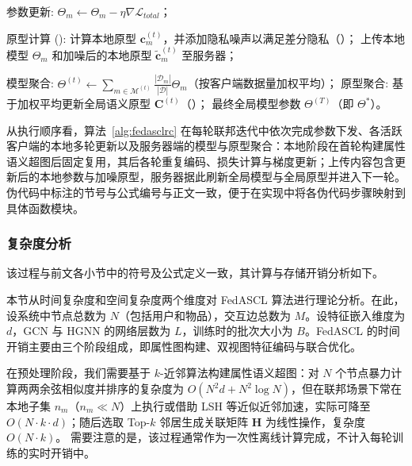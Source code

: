 \begin{algorithm}[H]
\begin{algorithmic}[1]
                    \State 参数更新: $\Theta_m \leftarrow \Theta_m - \eta \nabla \mathcal{L}_{total}$；
                \EndFor
                
                \State 原型计算 (): 计算本地原型 $\mathbf{c}_{m}^{(t)}$，并添加隐私噪声以满足差分隐私（）；
                \State 上传本地模型 $\Theta_m$ 和加噪后的本地原型 $\tilde{\mathbf{c}}_{m}^{(t)}$ 至服务器；
            \EndFor

            \State 模型聚合: $\Theta^{(t)} \leftarrow \sum_{m \in \mathcal{M}^{(t)}} \frac{|\mathcal{D}_m|}{|\mathcal{D}|} \Theta_m$（按客户端数据量加权平均）；
            \State 原型聚合: 基于加权平均更新全局语义原型 $\mathbf{C}^{(t)}$（）；
        \EndFor
        \State \Return 最终全局模型参数 $\Theta^{(T)}$（即 $\Theta^*$）。
    \end{algorithmic}
    \endgroup
\end{algorithm}

从执行顺序看，算法~\ref{alg:fedasclrc} 在每轮联邦迭代中依次完成参数下发、各活跃客户端的本地多轮更新以及服务器端的模型与原型聚合：本地阶段在首轮构建属性语义超图后固定复用，其后各轮重复编码、损失计算与梯度更新；上传内容包含更新后的本地参数与加噪原型，服务器据此刷新全局模型与全局原型并进入下一轮。伪代码中标注的节号与公式编号与正文一致，便于在实现中将各伪代码步骤映射到具体函数模块。

\subsubsection{复杂度分析}
\label{subsec:fedascl_complexity}

该过程与前文各小节中的符号及公式定义一致，其计算与存储开销分析如下。

本节从时间复杂度和空间复杂度两个维度对 FedASCL 算法进行理论分析。在此，设系统中节点总数为 $N$（包括用户和物品），交互边总数为 $M$。设特征嵌入维度为 $d$，GCN 与 HGNN 的网络层数为 $L$，训练时的批次大小为 $B$。FedASCL 的时间开销主要由三个阶段组成，即属性图构建、双视图特征编码与联合优化。

在预处理阶段，我们需要基于 $k$-近邻算法构建属性语义超图：对 $N$ 个节点暴力计算两两余弦相似度并排序的复杂度为 $O(N^2 d + N^2 \log N)$，但在联邦场景下常在本地子集 $n_m$（$n_m \ll N$）上执行或借助 LSH 等近似近邻加速，实际可降至 $O(N \cdot k \cdot d)$；随后选取 Top-$k$ 邻居生成关联矩阵 $\mathbf{H}$ 为线性操作，复杂度 $O(N \cdot k)$。
需要注意的是，该过程通常作为一次性离线计算完成，不计入每轮训练的实时开销中。

